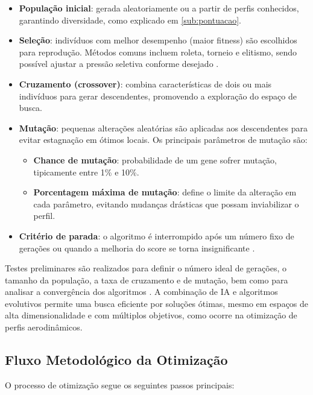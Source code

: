 \begin{itemize}
    \item \textbf{População inicial}: gerada aleatoriamente ou a partir de perfis conhecidos, garantindo diversidade, como explicado em \ref{sub:pontuacao}.
    \item \textbf{Seleção}: indivíduos com melhor desempenho (maior fitness) são escolhidos para reprodução. Métodos comuns incluem roleta, torneio e elitismo, sendo possível ajustar a pressão seletiva conforme desejado \cite{goldberg1989genetic}.
    \item \textbf{Cruzamento (crossover)}: combina características de dois ou mais indivíduos para gerar descendentes, promovendo a exploração do espaço de busca.
    \item \textbf{Mutação}: pequenas alterações aleatórias são aplicadas aos descendentes para evitar estagnação em ótimos locais. Os principais parâmetros de mutação são:
    \begin{itemize}
        \item \textbf{Chance de mutação}: probabilidade de um gene sofrer mutação, tipicamente entre 1\% e 10\%.
        \item \textbf{Porcentagem máxima de mutação}: define o limite da alteração em cada parâmetro, evitando mudanças drásticas que possam inviabilizar o perfil.
    \end{itemize}
    \item \textbf{Critério de parada}: o algoritmo é interrompido após um número fixo de gerações ou quando a melhoria do score se torna insignificante \cite{back1996evolutionary, oliveira2023}.
\end{itemize}

Testes preliminares são realizados para definir o número ideal de gerações, o tamanho da população, a taxa de cruzamento e de mutação, bem como para analisar a convergência dos algoritmos \cite{hasan2024, wu2024}. A combinação de IA e algoritmos evolutivos permite uma busca eficiente por soluções ótimas, mesmo em espaços de alta dimensionalidade e com múltiplos objetivos, como ocorre na otimização de perfis aerodinâmicos.

\subsection{Fluxo Metodológico da Otimização}
O processo de otimização segue os seguintes passos principais:

